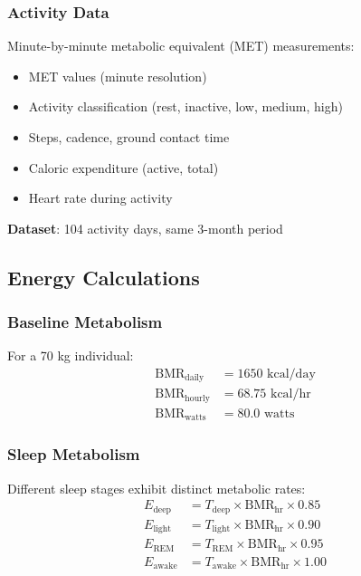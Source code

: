 \documentclass[12pt]{article}
\theoremstyle{remark}
\begin{document}
\subsubsection{Activity Data}

Minute-by-minute metabolic equivalent (MET) measurements:
\begin{itemize}
\item MET values (minute resolution)
\item Activity classification (rest, inactive, low, medium, high)
\item Steps, cadence, ground contact time
\item Caloric expenditure (active, total)
\item Heart rate during activity
\end{itemize}

\textbf{Dataset}: 104 activity days, same 3-month period

\subsection{Energy Calculations}

\subsubsection{Baseline Metabolism}

For a 70 kg individual:
\begin{align}
\text{BMR}_{\text{daily}} &= 1650 \text{ kcal/day} \\
\text{BMR}_{\text{hourly}} &= 68.75 \text{ kcal/hr} \\
\text{BMR}_{\text{watts}} &= 80.0 \text{ watts}
\end{align}

\subsubsection{Sleep Metabolism}

Different sleep stages exhibit distinct metabolic rates:
\begin{align}
E_{\text{deep}} &= T_{\text{deep}} \times \text{BMR}_{\text{hr}} \times 0.85 \\
E_{\text{light}} &= T_{\text{light}} \times \text{BMR}_{\text{hr}} \times 0.90 \\
E_{\text{REM}} &= T_{\text{REM}} \times \text{BMR}_{\text{hr}} \times 0.95 \\
E_{\text{awake}} &= T_{\text{awake}} \times \text{BMR}_{\text{hr}} \times 1.00
\end{align}
\end{document}
